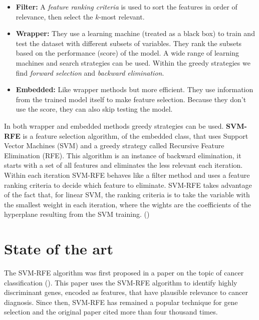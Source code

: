 \begin{itemize}
    \item \textbf{Filter:} A \emph{feature ranking criteria} is used to sort the features in order of relevance, then select the $k$-most relevant.
    \item \textbf{Wrapper:} They use a learning machine (treated as a black box) to train and test the dataset with different subsets of variables. They rank the subsets based on the performance (score) of the model. A wide range of learning machines and search strategies can be used. Within the greedy strategies we find \emph{forward selection} and \emph{backward elimination}.
    \item \textbf{Embedded:} Like wrapper methods but more efficient. They use information from the trained model itself to make feature selection. Because they don't use the score, they can also skip testing the model.
\end{itemize}

In both wrapper and embedded methods greedy strategies can be used. \textbf{SVM-RFE} is a feature selection algorithm, of the embedded class, that uses Support Vector Machines (SVM) and a greedy strategy called Recursive Feature Elimination (RFE). This algorithm is an instance of backward elimination, it starts with a set of all features and eliminates the less relevant each iteration. Within each iteration SVM-RFE behaves like a filter method and uses a feature ranking criteria to decide which feature to eliminate. SVM-RFE takes advantage of the fact that, for linear SVM, the ranking criteria is to take the variable with the smallest weight in each iteration, where the wights are the co\-ef\-fi\-cients of the hyperplane resulting from the SVM training.  (\cite{guyon_introduction_2003})


\section{State of the art}

The SVM-RFE algorithm was first proposed in a paper on the topic of cancer class\-ification (\cite{guyon_gene_2002}). This paper uses the SVM-RFE algorithm to identify highly discriminant genes, encoded as features, that have plausible relevance to cancer diagnosis. Since then, SVM-RFE has remained a popular technique for gene selection and the original paper cited more than four thousand times.

